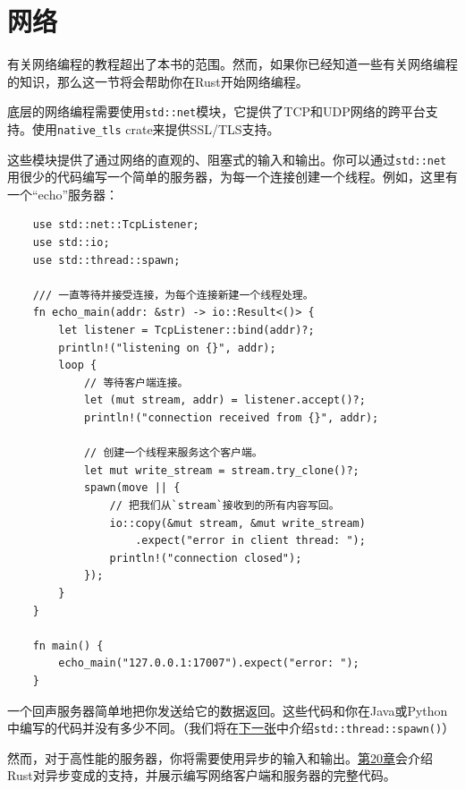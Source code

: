 \section{网络}

有关网络编程的教程超出了本书的范围。然而，如果你已经知道一些有关网络编程的知识，那么这一节将会帮助你在Rust开始网络编程。

底层的网络编程需要使用\texttt{std::net}模块，它提供了TCP和UDP网络的跨平台支持。使用\texttt{native\_tls} crate来提供SSL/TLS支持。

这些模块提供了通过网络的直观的、阻塞式的输入和输出。你可以通过\texttt{std::net}用很少的代码编写一个简单的服务器，为每一个连接创建一个线程。例如，这里有一个“echo”服务器：
\begin{verbatim}
    use std::net::TcpListener;
    use std::io;
    use std::thread::spawn;

    /// 一直等待并接受连接，为每个连接新建一个线程处理。
    fn echo_main(addr: &str) -> io::Result<()> {
        let listener = TcpListener::bind(addr)?;
        println!("listening on {}", addr);
        loop {
            // 等待客户端连接。
            let (mut stream, addr) = listener.accept()?;
            println!("connection received from {}", addr);

            // 创建一个线程来服务这个客户端。
            let mut write_stream = stream.try_clone()?;
            spawn(move || {
                // 把我们从`stream`接收到的所有内容写回。
                io::copy(&mut stream, &mut write_stream)
                    .expect("error in client thread: ");
                println!("connection closed");
            });
        }
    }

    fn main() {
        echo_main("127.0.0.1:17007").expect("error: ");
    }
\end{verbatim}

一个回声服务器简单地把你发送给它的数据返回。这些代码和你在Java或Python中编写的代码并没有多少不同。（我们将在\hyperref[ch19]{下一张}中介绍\texttt{std::thread::spawn()}）

然而，对于高性能的服务器，你将需要使用异步的输入和输出。\hyperref[ch20]{第20章}会介绍Rust对异步变成的支持，并展示编写网络客户端和服务器的完整代码。

